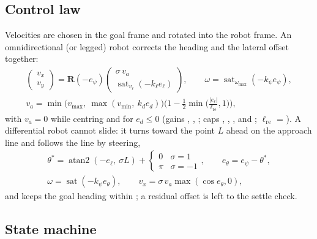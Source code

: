 \subsection{Control law}

Velocities are chosen in the goal frame and rotated into the robot frame. An omnidirectional
(or legged) robot corrects the heading and the lateral offset together:
\begin{gather}
  \begin{pmatrix} v_x \\ v_y \end{pmatrix} = \mathbf{R}(-e_\psi)
  \begin{pmatrix} \sigma\,v_a \\ \operatorname{sat}_{v_\ell}(-k_\ell e_\ell) \end{pmatrix},
  \qquad \omega = \operatorname{sat}_{\omega_{\max}}(-k_\psi e_\psi), \\
  v_a = \min\!\big(v_{\max},\ \max(v_{\min},\ k_d e_d)\big)
    \Big(1 - \tfrac12 \min\big(\tfrac{|e_\ell|}{\ell_{\mathrm{re}}}, 1\big)\Big),
\end{gather}
with $v_a = 0$ while centring and for $e_d \le 0$ (gains ,
, ; caps , ,
,  and ;
$\ell_{\mathrm{re}}$ = ). A differential robot cannot slide: it
turns toward the point  $L$ ahead on the approach line and follows
the line by steering,
\begin{gather}
  \theta^* = \operatorname{atan2}(-e_\ell,\ \sigma L) + \begin{cases} 0 & \sigma = 1 \\ \pi &
  \sigma = -1 \end{cases}, \qquad e_\theta = e_\psi - \theta^*, \\
  \omega = \operatorname{sat}(-k_\psi e_\theta), \qquad v_x = \sigma\,v_a \max(\cos e_\theta, 0),
\end{gather}
and keeps the goal heading within ; a residual offset is left to
the settle check.

\subsection{State machine}

